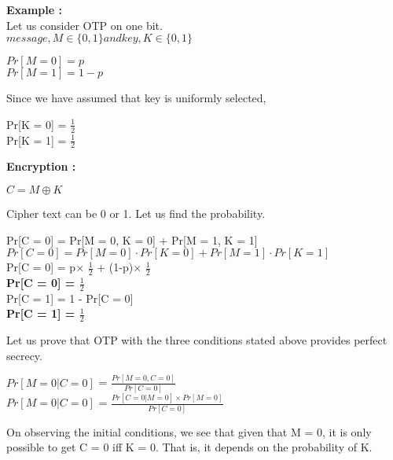 \documentclass[11pt]{article}
\begin{document}
\textbf{Example :}\\
Let us consider OTP on one bit.\\
$message, M\in\{0, 1\} and key, K\in\{0, 1\}$\\
\begin{center}
    $Pr[M = 0] = p$\\
     $Pr[M = 1] = 1-p $
\end{center}
Since we have assumed that key is uniformly selected,
\begin{center}
    Pr[K = 0] = \(\frac{1}{2}\)\\
    \vspace{3mm}
    Pr[K = 1] = \(\frac{1}{2}\)
\end{center}
\vspace{8mm}
\textbf{Encryption :}\\
\begin{center}
    $C = M\oplus K $
\end{center}
Cipher text can be 0 or 1. Let us find the probability.
\begin{center}
    Pr[C = 0] = Pr[M = 0, K = 0] + Pr[M = 1, K = 1]\\
    \vspace{3mm}
    $Pr[C = 0] = Pr[M = 0]\cdot Pr[K = 0] + Pr[M = 1]\cdot Pr[K = 1]$\\
    \vspace{3mm}
    Pr[C = 0] = p$\times$ \(\frac{1}{2}\) + (1-p)$\times$ \(\frac{1}{2}\)\\
    \vspace{3mm}
    \textbf{Pr[C = 0] = \(\frac{1}{2}\)}\\
    \vspace{5mm}
    Pr[C = 1] = 1 - Pr[C = 0]\\
    \vspace{3mm}
    \textbf{Pr[C = 1] = \(\frac{1}{2}\)}\\
\end{center}
Let us prove that OTP with the three conditions stated above provides perfect secrecy.
\begin{center}
    $Pr[M = 0 | C = 0]$ = \(\frac{Pr[M = 0, C = 0]}{Pr[C = 0]}\)\\
    \vspace{5mm}
    $Pr[M = 0 | C = 0]$ = $\frac{Pr[C = 0 | M = 0] \times Pr[M = 0]}{Pr[C = 0]}$\\
\end{center}
    On observing the initial conditions, we see that given that M = 0, it is only possible to get C = 0 iff K = 0. That is, it depends on the probability of K.\\
\end{document}
